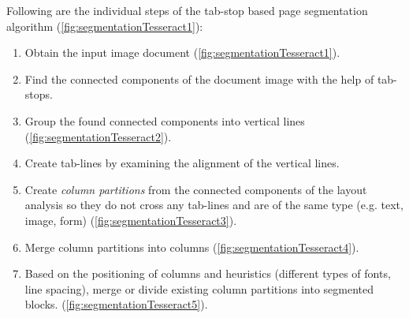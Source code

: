 Following are the individual steps of the tab-stop based page segmentation algorithm (\cref{fig:segmentationTesseract1}):
\begin{enumerate}
    \item Obtain the input image document (\cref{fig:segmentationTesseract1}).
    \item Find the connected components of the document image with the help of tab-stops.
    \item Group the found connected components into vertical lines (\cref{fig:segmentationTesseract2}).
    \item Create tab-lines by examining the alignment of the vertical lines.
    \item Create \emph{column partitions} from the connected components of the layout analysis so they do not cross any tab-lines and are of the same type (e.g. text, image, form) (\cref{fig:segmentationTesseract3}).
    \item Merge column partitions into columns (\cref{fig:segmentationTesseract4}).
    \item Based on the positioning of columns and heuristics (different types of fonts, line spacing), merge or divide existing column partitions into segmented blocks. (\cref{fig:segmentationTesseract5}).
\end{enumerate}



